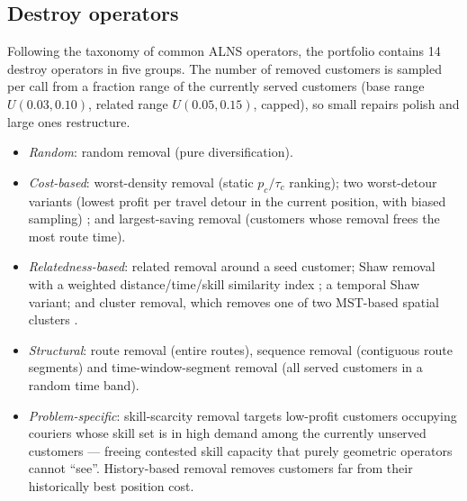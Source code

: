 \documentclass[10pt, a4paper]{article}
\begin{document}
\subsection{Destroy operators}
Following the taxonomy of common ALNS operators, the portfolio contains 14
destroy operators in five groups. The number of removed customers is sampled
per call from a fraction range of the currently served customers (base range
$U(0.03,0.10)$, related range $U(0.05,0.15)$, capped), so small repairs
polish and large ones restructure.
\begin{itemize}\itemsep2pt
\item \emph{Random}: random removal \cite{ropke2006} (pure
      diversification).
\item \emph{Cost-based}: worst-density removal (static $p_c/\tau_c$
      ranking); two worst-detour variants (lowest profit per travel detour
      in the current position, with biased sampling) \cite{ropke2006}; and
      largest-saving removal (customers whose removal frees the most route
      time).
\item \emph{Relatedness-based}: related removal around a seed customer;
      Shaw removal with a weighted distance/time/skill similarity index
      \cite{shaw1998}; a temporal Shaw variant; and cluster removal, which
      removes one of two MST-based spatial clusters \cite{pisinger2007}.
\item \emph{Structural}: route removal (entire routes), sequence removal
      (contiguous route segments) and time-window-segment removal (all
      served customers in a random time band).
\item \emph{Problem-specific}: skill-scarcity removal targets low-profit
      customers occupying couriers whose skill set is in high demand among
      the currently unserved customers --- freeing contested skill capacity
      that purely geometric operators cannot ``see''. History-based removal
      \cite{ropke2006} removes customers far from their historically best
      position cost.
\end{itemize}
\end{document}
